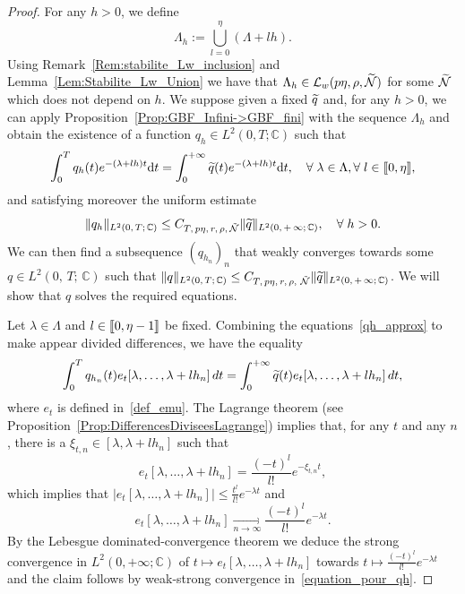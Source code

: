 \documentclass[AHL,Unicode,longabstracts]{cedram}
\newcommand{\llbracket}{\mathopen{[\mkern -2.7mu[}}
\newcommand{\rrbracket}{\mathclose{]\mkern -2.7mu]}}
\newcommand{\inter}[2]{\llbracket #1,#2 \rrbracket}
\newcommand{\LL}{\mathcal{L}}
\newcommand{\NN}{\mathcal{N}}
\newcommand{\C}{\mathbb{C}}
\newcommand{\md}{\mathrm{d}}
\let\oldtilde\tilde
\renewcommand*{\tilde}[1]{\mathchoice{\widetilde{#1}}{\widetilde{#1}}{\oldtilde{#1}}{\oldtilde{#1}}}\let\oldexists\exists
\renewcommand*{\exists}{\mathrel{\oldexists}}
\let\oldforall\forall
\renewcommand*{\forall}{\mathrel{\oldforall}}
\begin{document}
\begin{proof}
For any $h>0$, we define
\[
\Lambda_h:=\bigcup_{l=0}^{\eta} (\Lambda + l h).
\]
Using Remark~\ref{Rem:stabilite_Lw_inclusion} and Lemma~\ref{Lem:Stabilite_Lw_Union} we have that $\Lambda_h\in \LL_w(p\eta, \rho, \tilde{\NN})$ for some $\tilde{\NN}$ which does not depend on $h$. We suppose given a fixed $\tilde{q}$ and, for any $h>0$, we can apply Proposition~\ref{Prop:GBF_Infini->GBF_fini} with the sequence $\Lambda_h$ and obtain the existence of a function $q_h\in L^2(0,T;\C)$ such that
\begin{equation}\label{qh_approx}
\int_0^T q_h(t) e^{-(\lambda + lh) t} \md t = \int_0^{+\infty} \tilde{q}(t) e^{-(\lambda + lh) t} \md t, \quad\forall \lambda\in \Lambda, \forall l\in \inter{0}{\eta},
\end{equation}
and satisfying moreover the uniform estimate
\[
\|q_h\|_{L^2(0,\,T;\,\C)} \leq C_{T,\,p\eta,\,r,\,\rho, \,\tilde{\NN}} \|\tilde{q}\|_{L^2(0,\,+\,\infty;\,\C)}, \quad \forall h>0.
\]
We can then find a subsequence $(q_{h_n})_n$ that weakly converges towards some $q\in L^2(0,\,T;\,\C)$ such that $\|q\|_{L^2(0,\,T;\,\C)} \leq C_{T,\,p\eta,\,r,\,\rho,\, \,\tilde{\NN}} \|\tilde{q}\|_{L^2(0,\,+\,\infty;\,\C)}$. We will show that $q$ solves the required equations.

Let $\lambda\in \Lambda$ and $l\in \inter{0}{\eta-1}$ be fixed. Combining the equations~\eqref{qh_approx} to make appear divided differences, we have the equality
\begin{equation}\label{equation_pour_qh}
\int_0^{T} q_{h_n}(t) e_t[\lambda,\dotsc,\lambda+lh_n] \, dt = \int_0^{+\infty} \tilde{q}(t) e_t[\lambda,\dotsc,\lambda+l h_n] \, dt,
\end{equation}
where $e_t$ is defined in~\eqref{def_emu}. The Lagrange theorem (see Proposition~\ref{Prop:DifferencesDiviseesLagrange}) implies that, for any $t$ and any $n$, there is a $\xi_{t,n}\in [\lambda,\lambda+lh_n]$ such that
\[
e_t[\lambda,\dotsc,\lambda+lh_n] = \frac{(-t)^l}{l!} e^{-\xi_{t,n} t},
\]
which implies that $| e_t[\lambda,\dotsc,\lambda+lh_n]|\leq \frac{t^l}{l!} e^{-\lambda t}$ and
\[
e_t[\lambda,\dotsc,\lambda+lh_n]\xrightarrow[n\to \infty]{} \frac{(-t)^l}{l!} e^{-\lambda t}.
\]
By the Lebesgue dominated-convergence theorem we deduce the strong convergence in $L^2(0,+\infty;\C)$ of $t\mapsto e_t[\lambda,\dotsc,\lambda+lh_n]$ towards $t\mapsto \frac{(-t)^l}{l!} e^{-\lambda t}$ and the claim follows by weak-strong convergence in~\eqref{equation_pour_qh}.
\end{proof}
\end{document}
